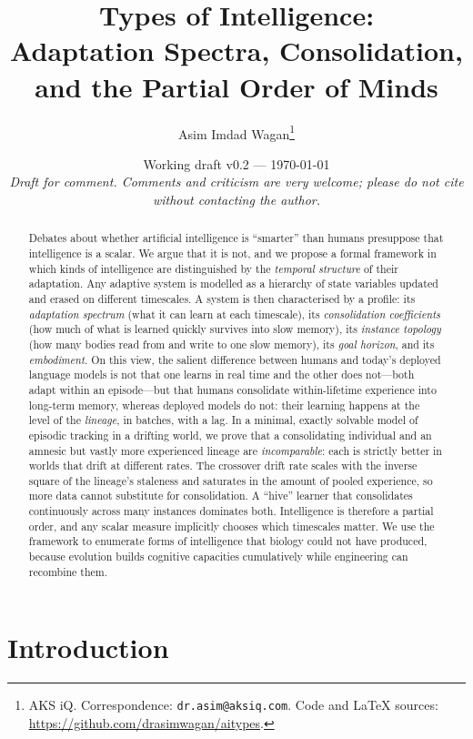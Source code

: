 \documentclass[11pt]{article}
\title{\textbf{Types of Intelligence:}\\[2pt]
\Large Adaptation Spectra, Consolidation, and the Partial Order of Minds}
\author{Asim Imdad Wagan\thanks{AKS iQ. Correspondence: \texttt{dr.asim@aksiq.com}. Code and \LaTeX{} sources: \url{https://github.com/drasimwagan/aitypes}.}}
\date{Working draft v0.2 --- \today\\[4pt]
\small\textit{Draft for comment. Comments and criticism are very welcome; please do not cite without contacting the author.}}
\theoremstyle{plain}
\theoremstyle{definition}
\theoremstyle{remark}
\begin{document}
\maketitle

\begin{abstract}
Debates about whether artificial intelligence is ``smarter'' than humans presuppose that intelligence is a scalar. We argue that it is not, and we propose a formal framework in which kinds of intelligence are distinguished by the \emph{temporal structure} of their adaptation. Any adaptive system is modelled as a hierarchy of state variables updated and erased on different timescales. A system is then characterised by a profile: its \emph{adaptation spectrum} (what it can learn at each timescale), its \emph{consolidation coefficients} (how much of what is learned quickly survives into slow memory), its \emph{instance topology} (how many bodies read from and write to one slow memory), its \emph{goal horizon}, and its \emph{embodiment}. On this view, the salient difference between humans and today's deployed language models is not that one learns in real time and the other does not---both adapt within an episode---but that humans consolidate within-lifetime experience into long-term memory, whereas deployed models do not: their learning happens at the level of the \emph{lineage}, in batches, with a lag. In a minimal, exactly solvable model of episodic tracking in a drifting world, we prove that a consolidating individual and an amnesic but vastly more experienced lineage are \emph{incomparable}: each is strictly better in worlds that drift at different rates. The crossover drift rate scales with the inverse square of the lineage's staleness and saturates in the amount of pooled experience, so more data cannot substitute for consolidation. A ``hive'' learner that consolidates continuously across many instances dominates both. Intelligence is therefore a partial order, and any scalar measure implicitly chooses which timescales matter. We use the framework to enumerate forms of intelligence that biology could not have produced, because evolution builds cognitive capacities cumulatively while engineering can recombine them.
\end{abstract}

\section{Introduction}
\label{sec:intro}
\end{document}
